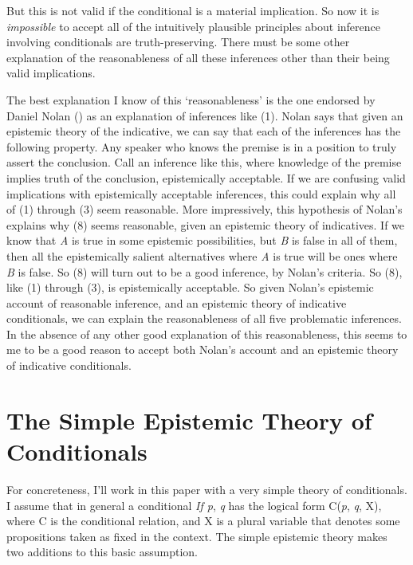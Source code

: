 \documentclass[
  11pt,
  letterpaper,
  DIV=11,
  numbers=noendperiod,
  twoside]{scrartcl}
\begin{document}
But this is not valid if the conditional is a material implication. So
now it is \emph{impossible} to accept all of the intuitively plausible
principles about inference involving conditionals are truth-preserving.
There must be some other explanation of the reasonableness of all these
inferences other than their being valid implications.

The best explanation I know of this `reasonableness' is the one endorsed
by Daniel Nolan () as an explanation of
inferences like (1). Nolan says that given an epistemic theory of the
indicative, we can say that each of the inferences has the following
property. Any speaker who knows the premise is in a position to truly
assert the conclusion. Call an inference like this, where knowledge of
the premise implies truth of the conclusion, epistemically acceptable.
If we are confusing valid implications with epistemically acceptable
inferences, this could explain why all of (1) through (3) seem
reasonable. More impressively, this hypothesis of Nolan's explains why
(8) seems reasonable, given an epistemic theory of indicatives. If we
know that \emph{A} is true in some epistemic possibilities, but \emph{B}
is false in all of them, then all the epistemically salient alternatives
where \emph{A} is true will be ones where \emph{B} is false. So (8) will
turn out to be a good inference, by Nolan's criteria. So (8), like (1)
through (3), is epistemically acceptable. So given Nolan's epistemic
account of reasonable inference, and an epistemic theory of indicative
conditionals, we can explain the reasonableness of all five problematic
inferences. In the absence of any other good explanation of this
reasonableness, this seems to me to be a good reason to accept both
Nolan's account and an epistemic theory of indicative conditionals.

\section{The Simple Epistemic Theory of
Conditionals}\label{the-simple-epistemic-theory-of-conditionals}

For concreteness, I'll work in this paper with a very simple theory of
conditionals. I assume that in general a conditional \emph{If p},
\emph{q} has the logical form C(\emph{p}, \emph{q}, X), where C is the
conditional relation, and X is a plural variable that denotes some
propositions taken as fixed in the context. The simple epistemic theory
makes two additions to this basic assumption.
\end{document}
